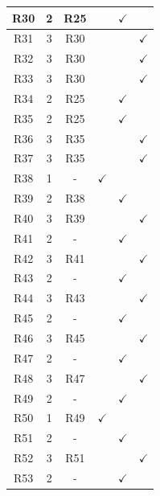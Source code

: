 \documentclass[12pt,a4paper,oneside]{article}
\begin{document}
\begin{longtable}[c]{|c|c|c|c|c|c|}
    \hline
    R30 & 2 & R25 & & $\checkmark$ & \\
    \hline
    R31 & 3 & R30 & & & $\checkmark$ \\
    \hline
    R32 & 3 & R30 & & & $\checkmark$ \\
    \hline
    R33 & 3 & R30 & & & $\checkmark$ \\
    \hline
    R34 & 2 & R25 & & $\checkmark$ & \\
    \hline
    R35 & 2 & R25 & & $\checkmark$ & \\
    \hline
    R36 & 3 & R35 & & & $\checkmark$ \\
    \hline
    R37 & 3 & R35 & & & $\checkmark$ \\
    \hline
    R38 & 1 & - & $\checkmark$ & & \\
    \hline
    R39 & 2 & R38 & & $\checkmark$ & \\
    \hline
    R40 & 3 & R39 & & & $\checkmark$ \\
    \hline
    R41 & 2 & - & & $\checkmark$ & \\
    \hline
    R42 & 3 & R41 & & & $\checkmark$ \\
    \hline
    R43 & 2 & - & & $\checkmark$ & \\
    \hline
    R44 & 3 & R43 & & & $\checkmark$ \\
    \hline
    R45 & 2 & - & & $\checkmark$ & \\
    \hline
    R46 & 3 & R45 & & & $\checkmark$ \\
    \hline
    R47 & 2 & - & & $\checkmark$ & \\
    \hline
    R48 & 3 & R47 & & & $\checkmark$ \\
    \hline
    R49 & 2 & - & & $\checkmark$ & \\
    \hline
    R50 & 1 & R49 & $\checkmark$ & & \\
    \hline
    R51 & 2 & - & & $\checkmark$ & \\
    \hline
    R52 & 3 & R51 & & & $\checkmark$ \\
    \hline
    R53 & 2 & - & & $\checkmark$ & \\
\end{longtable}

\newpage
\end{document}
